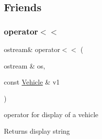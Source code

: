 \subsection{Friends}
\mbox{\label{group___vehicle_ga854e861646772cea9bb6222c5b03b1d4}} 
\subsubsection{\texorpdfstring{operator$<$$<$}{operator<<}}
{\footnotesize\ttfamily ostream\& operator$<$$<$ (\begin{DoxyParamCaption}\item[{ostream \&}]{os,  }\item[{const \hyperlink{class_vehicle}{Vehicle} \&}]{v1 }\end{DoxyParamCaption})\hspace{0.3cm}{\ttfamily [friend]}}



operator for display of a vehicle 

\begin{DoxyReturn}{Returns}
display string 
\end{DoxyReturn}
